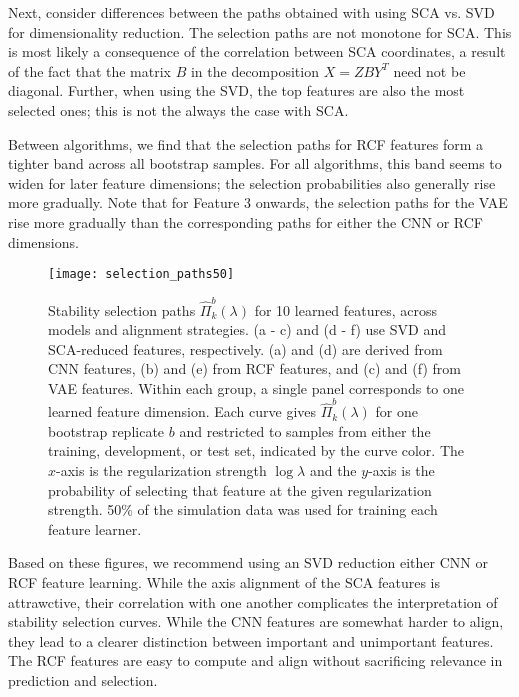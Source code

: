 Next, consider differences between the paths obtained with using SCA vs. SVD for
dimensionality reduction. The selection paths are not monotone for SCA. This is
most likely a consequence of the correlation between SCA coordinates, a result
of the fact that the matrix $B$ in the decomposition $X = Z B Y^{T}$ need not be
diagonal. Further, when using the SVD, the top features are also the most
selected ones; this is not the always the case with SCA.

Between algorithms, we find that the selection paths for RCF features form a
tighter band across all bootstrap samples. For all algorithms, this band seems
to widen for later feature dimensions; the selection probabilities also
generally rise more gradually. Note that for Feature 3 onwards, the selection
paths for the VAE rise more gradually than the corresponding paths for either
the CNN or RCF dimensions.

\begin{figure}
  \centering
  \texttt{[image: selection\_paths50]}
  \caption{Stability selection paths $\hat{\Pi}_{k}^{b}\left(\lambda\right)$ for
    10 learned features, across models and alignment strategies. (a - c) and (d
    - f) use SVD and SCA-reduced features, respectively. (a) and (d) are derived
    from CNN features, (b) and (e) from RCF features, and (c) and (f) from VAE
    features. Within each group, a single panel corresponds to one learned
    feature dimension. Each curve gives $\hat{\Pi}_{k}^{b}\left(\lambda\right)$
    for one bootstrap replicate $b$ and restricted to samples from either the
    training, development, or test set, indicated by the curve color. The
    $x$-axis is the regularization strength $\log \lambda$ and the $y$-axis is
    the probability of selecting that feature at the given regularization
    strength. 50\% of the simulation data was used for training each feature
    learner.}
  \label{fig:selection_paths50}
\end{figure}

Based on these figures, we recommend using an SVD reduction either CNN or RCF
feature learning. While the axis alignment of the SCA features is attrawctive,
their correlation with one another complicates the interpretation of stability
selection curves. While the CNN features are somewhat harder to align, they lead
to a clearer distinction between important and unimportant features. The RCF
features are easy to compute and align without sacrificing relevance in
prediction and selection.
